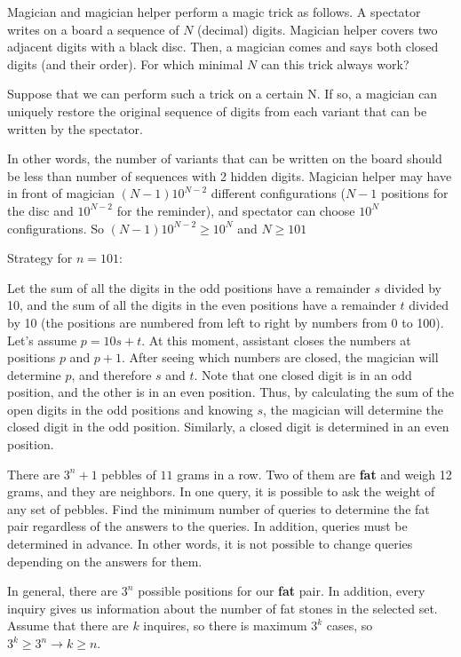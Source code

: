 \begin{example} [Russia 1997]
    Magician and magician helper perform a magic trick as follows. A spectator writes on a board a sequence of $N$ (decimal) digits. Magician helper covers two adjacent digits with a black disc. Then, a magician comes and says both closed digits (and their order). For which minimal $N$ can this trick always work? 
\end{example}

\sol Suppose that we can perform such a trick on a certain N. If so, a magician can uniquely restore the original sequence of digits from each variant that can be written by the spectator. 

In other words, the number of variants that can be written on the board should be less than number of sequences with 2 hidden digits. Magician helper may have in front of magician $(N-1)10^{N-2}$ different configurations ($N-1$ positions for the disc and $10^{N-2}$ for the reminder), and spectator can choose $10^{N}$ configurations. So $(N-1)10^{N-2}\geq 10^{N}$ and $N\geq 101$

Strategy for $n=101$:

Let the sum of all the digits in the odd positions have a remainder $s$ divided by 10, and the sum of all the digits in the even positions have a remainder $t$ divided by 10 (the positions are numbered from left to right by numbers from 0 to 100). Let's assume $p = 10s + t$. At this moment, assistant closes the numbers at positions $p$ and $p + 1$.  After seeing which numbers are closed, the magician will determine $p$, and therefore $s$ and $t$. Note that one closed digit is in an odd position, and the other is in an even position. Thus, by calculating the sum of the open digits in the odd positions and knowing $s$, the magician will determine the closed digit in the odd position. Similarly, a closed digit is determined in an even position.

\begin{example} [IMSC 2025]
There are $3^n+1$ pebbles of $11$ grams in a row. Two of them are \textbf{fat} and weigh 12 grams, and they are neighbors. In one query, it is possible to ask the weight of any set of pebbles. Find the minimum number of queries to determine the fat pair regardless of the answers to the queries. In addition, queries must be determined in advance. In other words, it is not possible to change queries depending on the answers for them. 
\end{example}

\sol In general, there are $3^n$ possible positions for our \textbf{fat} pair. In addition, every inquiry gives us information about the number of fat stones in the selected set. Assume that there are $k$ inquires, so there is maximum $3^k$ cases, so $3^k \geq 3^n \rightarrow k\geq n$. 

